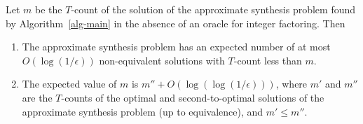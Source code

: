 \documentclass{article}
\begin{document}
\begin{proposition}
  \label{prop-near-optimality}
  Let $m$ be the $T$-count of the solution of the approximate
  synthesis problem found by Algorithm~\ref{alg-main} in the absence
  of an oracle for integer factoring. Then
  \begin{enumerate}\alphalabels
  \item The approximate synthesis problem has an expected number of at
    most $O(\log(1/\epsilon))$ non-equivalent solutions with $T$-count
    less than $m$.
  \item The expected value of $m$ is $m'' +
    O(\log(\log(1/\epsilon)))$, where $m'$ and $m''$ are the
    $T$-counts of the optimal and second-to-optimal solutions of the
    approximate synthesis problem (up to equivalence), and $m'\leq m''$.
  \end{enumerate}
\end{proposition}
\end{document}
